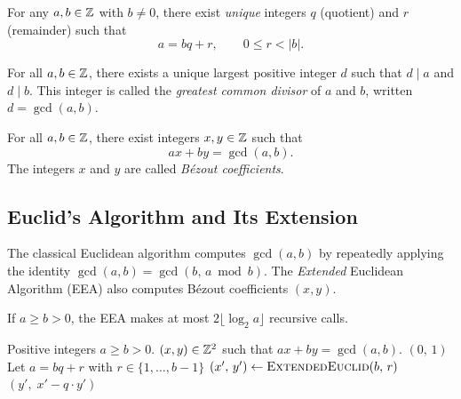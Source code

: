 \documentclass[11pt]{article}
\begin{document}
\begin{fact}
  \label{fact:division}
  For any $a, b \in \mathbb{Z}$ with $b \neq 0$, there exist \emph{unique}
  integers $q$ (quotient) and $r$ (remainder) such that
  \[
    a = b q + r, \qquad 0 \le r < |b|.
  \]
\end{fact}

\begin{fact}
  \label{fact:gcd}
  For all $a, b \in \mathbb{Z}$, there exists a unique largest positive integer
  $d$ such that $d \mid a$ and $d \mid b$.  This integer is called the
  \emph{greatest common divisor} of $a$ and $b$, written
  $d = \gcd(a, b)$.
\end{fact}

\begin{fact}
  \label{fact:bezout}
  For all $a, b \in \mathbb{Z}$, there exist integers $x, y \in \mathbb{Z}$ such that
  \[
    ax + by = \gcd(a, b).
  \]
  The integers $x$ and $y$ are called \emph{B\'ezout coefficients}.
\end{fact}

\subsection{Euclid's Algorithm and Its Extension}

The classical Euclidean algorithm computes $\gcd(a, b)$ by repeatedly
applying the identity $\gcd(a, b) = \gcd(b,\, a \bmod b)$.  The
\emph{Extended} Euclidean Algorithm (EEA) also computes B\'ezout
coefficients $(x, y)$.

\begin{theorem}
  If $a \ge b > 0$, the EEA makes at most $2\lfloor\log_2 a\rfloor$
  recursive calls.
\end{theorem}

\begin{algorithm}
\caption{$\textsc{ExtendedEuclid}(a,\, b)$}
\begin{algorithmic}[1]
\Require Positive integers $a \ge b > 0$.
\Ensure $(x, y) \in \mathbb{Z}^2$ such that $ax + by = \gcd(a, b)$.
  \State \Return $(0,\, 1)$
\Else
  \State Let $a = bq + r$ with $r \in \{1, \ldots, b-1\}$
  \State $(x',\, y') \gets \textsc{ExtendedEuclid}(b,\, r)$
  \State \Return $(y',\; x' - q \cdot y')$
\EndIf
\end{algorithmic}
\end{algorithm}
\end{document}
